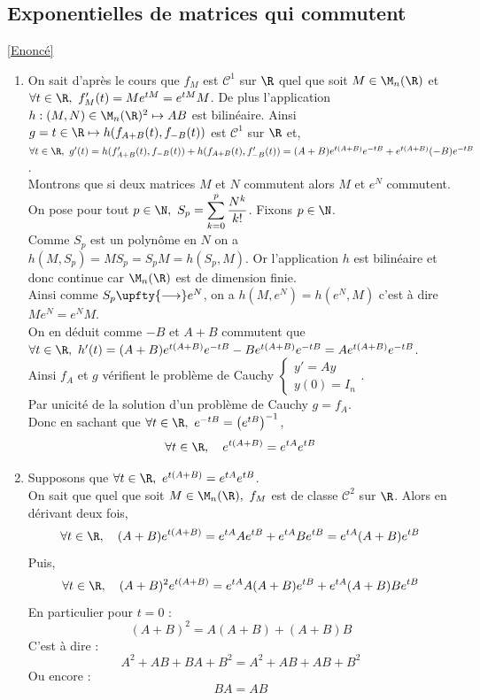 \documentclass{book}
\begin{document}
	\subsection{Exponentielles de matrices qui commutent }
	\label{sec:exponentielles-de-matrices-qui-commutent-etoile2}
	\textcolor{blue}{\hyperref[Exponentielles de matrices qui commutent]{[Enoncé]}}\\
	\begin{enumerate}[leftmargin=*]
		\item On sait d'après le cours que $f_M$ est $\mathcal C^1$ sur $\R$ quel que soit $M\in \M_n(\R)$ et $\forall t\in \R,\ f_M'(t)=Me^{tM}=e^{tM}M$. De plus l'application $h:(M,N)\in \M_n(\R)^2\mapsto AB$ est bilinéaire. Ainsi $g=t\in \R \mapsto h(f_{A+B}(t),f_{-B}(t))$ est $\mathcal C^1$ sur $\R$ et,\\
		$\forall t\in \R,\ g'(t)=h(f_{A+B}'(t),f_{-B}(t))+h(f_{A+B}(t),f_{-B}'(t))=(A+B)e^{t(A+B)}e^{-tB}+e^{t(A+B)}(-B)e^{-tB}$.\\
		Montrons que si deux matrices $M$ et $N$ commutent alors $M$ et $e^N$ commutent. On pose pour tout $p\in \N,\ S_p=\displaystyle\sum_{k=0}^p\frac{N^k}{k!}$. Fixons $p\in \N$.\\
		Comme $S_p$ est un polynôme en $N$ on a $h(M,S_p)=MS_p=S_pM=h(S_p,M)$. Or l'application $h$ est bilinéaire et donc continue car $\M_n(\R)$ est de dimension finie.\\
		Ainsi comme $S_p\upfty{\longrightarrow}e^N$, on a $h(M,e^N)=h(e^N,M)$ c'est à dire $Me^N=e^NM$.\\
		On en déduit comme $-B$ et $A+B$ commutent que $\forall t\in \R,\ h'(t)=(A+B)e^{t(A+B)}e^{-tB}-Be^{t(A+B)}e^{-tB}=Ae^{t(A+B)}e^{-tB}$.\\
		Ainsi $f_A$ et $g$ vérifient le problème de Cauchy
		$\begin{cases}
			y'=Ay\\
			y(0)=I_n
		\end{cases}$.\\
		Par unicité de la solution d'un problème de Cauchy $g=f_A$.\\
		Donc en sachant que $\forall t\in \R,\ e^{-tB}=\left(e^{tB}\right)^{-1}$,
		$$\forall t\in \R,\quad e^{t(A+B)}=e^{tA}e^{tB}$$
		\item Supposons que $\forall t\in \R,\ e^{t(A+B)}=e^{tA}e^{tB}$.\\
		On sait que quel que soit $M\in \M_n(\R),\ f_M$ est de classe $\mathcal C^2$ sur $\R$. Alors en dérivant deux fois,\\
		$$\forall t\in \R,\quad (A+B)e^{t(A+B)}=e^{tA}Ae^{tB}+e^{tA}Be^{tB}=e^{tA}(A+B)e^{tB}$$
		Puis,
		$$\forall t\in \R,\quad (A+B)^2e^{t(A+B)}=e^{tA}A(A+B)e^{tB}+e^{tA}(A+B)Be^{tB}$$
		En particulier pour $t=0$ :
		$$(A+B)^2=A(A+B)+(A+B)B$$
		C'est à dire :
		$$A^2+AB+BA+B^2=A^2+AB+AB+B^2$$
		Ou encore :
		$$BA=AB$$
	\end{enumerate}
	
\end{document}
